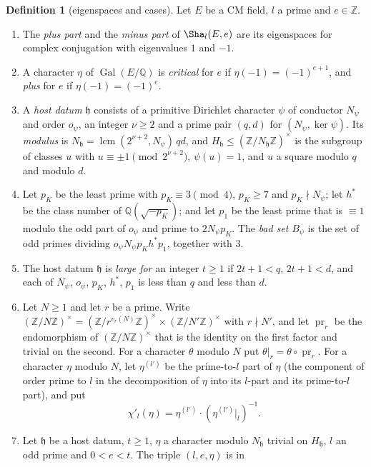 \documentclass[11pt]{amsbook}
\theoremstyle{plain}
\theoremstyle{definition}
\newtheorem{definition}[theorem]{Definition}
\theoremstyle{remark}
\numberwithin{equation}{section}
\numberwithin{figure}{chapter}
\numberwithin{table}{chapter}
\newcommand{\Q}{\mathbb{Q}}
\newcommand{\Z}{\mathbb{Z}}
\newcommand{\Gal}{\operatorname{Gal}}
\begin{document}
\begin{definition}[eigenspaces and cases]\label{def:cases}
Let $E$ be a CM field, $l$ a prime and $e\in\Z$.
\begin{enumerate}[label=(\arabic*)]
\item The \emph{plus part} and the \emph{minus part} of
$\Sha_l(E,e)$ are its eigenspaces for complex conjugation with
eigenvalues $1$ and $-1$.
\item A character $\eta$ of $\Gal(E/\Q)$ is \emph{critical} for $e$ if
$\eta(-1)=(-1)^{e+1}$, and \emph{plus} for $e$ if $\eta(-1)=(-1)^e$.
\item A \emph{host datum} $\mathfrak h$ consists of a primitive Dirichlet
character $\psi$ of conductor $N_\psi$ and order $o_\psi$, an integer
$\nu\ge2$ and a prime pair $(q,d)$ for $(N_\psi,\ker\psi)$. Its
\emph{modulus} is $N_{\mathfrak h}=\operatorname{lcm}(2^{\nu+2},N_\psi)\,qd$,
and
$H_{\mathfrak h}\le(\Z/N_{\mathfrak h}\Z)^\times$ is the subgroup of classes $u$
with
$u\equiv\pm1\pmod{2^{\nu+2}}$, $\psi(u)=1$, and $u$ a square modulo
$q$ and modulo $d$.
\item Let $p_K$ be the least prime with $p_K\equiv3\pmod4$, $p_K\ge7$
and $p_K\nmid N_\psi$; let $h^*$ be the class number of
$\Q(\sqrt{-p_K})$; and let $p_1$ be the least prime that is
$\equiv1$ modulo the odd part of $o_\psi$ and prime to $2N_\psi p_K$.
The \emph{bad set} $B_\psi$ is the set of odd primes dividing
$o_\psi N_\psi p_Kh^*p_1$, together with $3$.
\item The host datum $\mathfrak h$ is \emph{large for} an integer $t\ge1$ if
$2t+1<q$, $2t+1<d$, and each of $N_\psi$, $o_\psi$, $p_K$, $h^*$, $p_1$
is less than $q$ and less than $d$.
\item Let $N\ge1$ and let $r$ be a prime. Write
$(\Z/N\Z)^\times=(\Z/r^{v_r(N)}\Z)^\times\times(\Z/N'\Z)^\times$ with
$r\nmid N'$, and let $\operatorname{pr}_r$ be the endomorphism of
$(\Z/N\Z)^\times$ that is the identity on the first factor and trivial
on the second. For a character $\theta$ modulo $N$ put
$\theta|_r=\theta\circ\operatorname{pr}_r$. For a character $\eta$
modulo $N$, let $\eta^{(l')}$ be the prime-to-$l$ part of $\eta$ (the component
of order prime to $l$ in
the decomposition of $\eta$ into its $l$-part and its prime-to-$l$
part), and put
\[
\chi'_l(\eta)=\eta^{(l')}\cdot(\eta^{(l')}|_l)^{-1}.
\]
\item Let $\mathfrak h$ be a host datum, $t\ge1$, $\eta$ a character modulo
$N_{\mathfrak h}$ trivial on $H_{\mathfrak h}$, $l$ an odd prime and $0<e<t$.
The triple
$(l,e,\eta)$ is in

\end{enumerate}
\end{definition}
\end{document}
